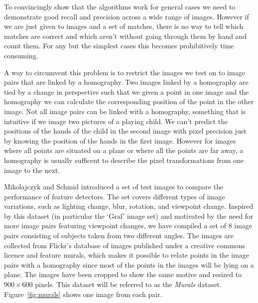 To convincingly show that the algorithms work for general cases we need 
to demonstrate good recall and precision across a wide range of images.  
However if we are just given to images and a set of matches, there is no
way to tell which matches are correct and which aren't without going 
through them by hand and count them. For any but the simplest cases this
becomes prohibitively time consuming.

A way to circumvent this problem is to restrict the images we test on to 
image pairs that are linked by a homography. Two images linked by a 
homography are tied by a change in perspective such that we given a 
point in one image and the homography we can calculate the corresponding 
position of the point in the other image. Not all image pairs can be 
linked with a homography, something that is intuitive if we image two 
pictures of a playing child. We can't predict the positions of the hands
of the child in the second image with pixel precision just by knowing 
the position of the hands in the first image. However for images where 
all points are situated on a plane or where all the points are far away,
a homography is usually sufficent to describe the pixel transformations 
from one image to the next.

Mikolajczyk and Schmid  \cite{mikolajczyk2005performance} introduced a 
set of test images to compare the performance of feature detectors. The 
set covers different types of image variations, such as lighting change, 
blur, rotation, and viewpoint change. Inspired by this dataset (in 
particular the `Graf' image set) and motivated by the need for more 
image pairs featuring viewpoint changes, we have compiled a set of 8 
image pairs consisting of subjects taken from two different angles. The 
images are collected from Flickr's database of images published under a 
creative commons licence and feature murals, which makes it possible to 
relate points in the image pairs with a homography since most of the 
points in the images will be lying on a plane.  The images have been 
cropped to show the same motive and resized to $900\times 600$ pixels.  
This dataset will be referred to as the \emph{Murals} dataset.  
Figure~\ref{fig:murals} shows one image from each pair.

